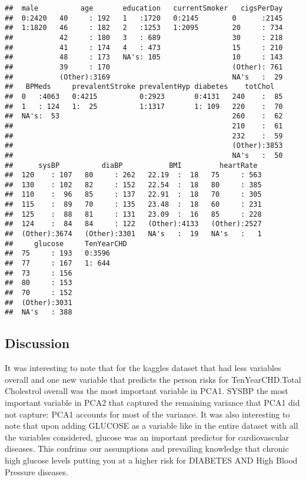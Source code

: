 \documentclass[]{article}
\begin{document}
\begin{verbatim}
##  male          age       education   currentSmoker   cigsPerDay  
##  0:2420   40     : 192   1   :1720   0:2145        0      :2145  
##  1:1820   46     : 182   2   :1253   1:2095        20     : 734  
##           42     : 180   3   : 689                 30     : 218  
##           41     : 174   4   : 473                 15     : 210  
##           48     : 173   NA's: 105                 10     : 143  
##           39     : 170                             (Other): 761  
##           (Other):3169                             NA's   :  29  
##   BPMeds     prevalentStroke prevalentHyp diabetes    totChol    
##  0   :4063   0:4215          0:2923       0:4131   240    :  85  
##  1   : 124   1:  25          1:1317       1: 109   220    :  70  
##  NA's:  53                                         260    :  62  
##                                                    210    :  61  
##                                                    232    :  59  
##                                                    (Other):3853  
##                                                    NA's   :  50  
##      sysBP          diaBP           BMI         heartRate   
##  120    : 107   80     : 262   22.19  :  18   75     : 563  
##  130    : 102   82     : 152   22.54  :  18   80     : 385  
##  110    :  96   85     : 137   22.91  :  18   70     : 305  
##  115    :  89   70     : 135   23.48  :  18   60     : 231  
##  125    :  88   81     : 131   23.09  :  16   85     : 228  
##  124    :  84   84     : 122   (Other):4133   (Other):2527  
##  (Other):3674   (Other):3301   NA's   :  19   NA's   :   1  
##     glucose     TenYearCHD
##  75     : 193   0:3596    
##  77     : 167   1: 644    
##  73     : 156             
##  80     : 153             
##  70     : 152             
##  (Other):3031             
##  NA's   : 388
\end{verbatim}

\subsection{Discussion}\label{discussion-1}

It was interesting to note that for the kaggles dataset that had less
variables overall and one new variable that predicts the person risks
for TenYearCHD.Total Cholestrol overall was the most important variable
in PCA1. SYSBP the most important variable in PCA2 that captured the
remaining variance that PCA1 did not capture: PCA1 accounts for most of
the variance. It was also interesting to note that upon adding GLUCOSE
as a variable like in the entire dataset with all the variables
considered, glucose was an important predictor for cardiovascular
diseases. This confrims our assumptions and prevailing knowledge that
chronic high glucose levels putting you at a higher risk for DIABETES
AND High Blood Pressure diseases.
\end{document}
